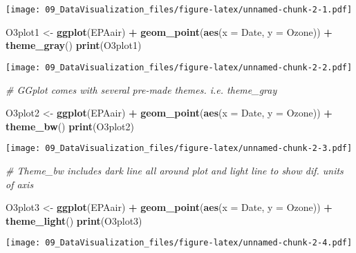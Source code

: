 \documentclass[]{article}
\newenvironment{Shaded}{\begin{snugshade}}{\end{snugshade}}
\newcommand{\KeywordTok}[1]{\textcolor[rgb]{0.13,0.29,0.53}{\textbf{#1}}}
\newcommand{\DataTypeTok}[1]{\textcolor[rgb]{0.13,0.29,0.53}{#1}}
\newcommand{\StringTok}[1]{\textcolor[rgb]{0.31,0.60,0.02}{#1}}
\newcommand{\CommentTok}[1]{\textcolor[rgb]{0.56,0.35,0.01}{\textit{#1}}}
\newcommand{\OperatorTok}[1]{\textcolor[rgb]{0.81,0.36,0.00}{\textbf{#1}}}
\newcommand{\NormalTok}[1]{#1}
\begin{document}
\texttt{[image: 09\_DataVisualization\_files/figure-latex/unnamed-chunk-2-1.pdf]}

\begin{Shaded}
\begin{Highlighting}[]
\NormalTok{O3plot1 <-}\StringTok{ }\KeywordTok{ggplot}\NormalTok{(EPAair) }\OperatorTok{+}
\StringTok{  }\KeywordTok{geom_point}\NormalTok{(}\KeywordTok{aes}\NormalTok{(}\DataTypeTok{x =}\NormalTok{ Date, }\DataTypeTok{y =}\NormalTok{ Ozone)) }\OperatorTok{+}
\StringTok{  }\KeywordTok{theme_gray}\NormalTok{()}
\KeywordTok{print}\NormalTok{(O3plot1)}
\end{Highlighting}
\end{Shaded}

\texttt{[image: 09\_DataVisualization\_files/figure-latex/unnamed-chunk-2-2.pdf]}

\begin{Shaded}
\begin{Highlighting}[]
\CommentTok{# GGplot comes with several pre-made themes. i.e. theme_gray}

\NormalTok{O3plot2 <-}\StringTok{ }\KeywordTok{ggplot}\NormalTok{(EPAair) }\OperatorTok{+}
\StringTok{  }\KeywordTok{geom_point}\NormalTok{(}\KeywordTok{aes}\NormalTok{(}\DataTypeTok{x =}\NormalTok{ Date, }\DataTypeTok{y =}\NormalTok{ Ozone)) }\OperatorTok{+}
\StringTok{  }\KeywordTok{theme_bw}\NormalTok{()}
\KeywordTok{print}\NormalTok{(O3plot2)}
\end{Highlighting}
\end{Shaded}

\texttt{[image: 09\_DataVisualization\_files/figure-latex/unnamed-chunk-2-3.pdf]}

\begin{Shaded}
\begin{Highlighting}[]
\CommentTok{# Theme_bw includes dark line all around plot and light line to show dif. units of axis}

\NormalTok{O3plot3 <-}\StringTok{ }\KeywordTok{ggplot}\NormalTok{(EPAair) }\OperatorTok{+}
\StringTok{  }\KeywordTok{geom_point}\NormalTok{(}\KeywordTok{aes}\NormalTok{(}\DataTypeTok{x =}\NormalTok{ Date, }\DataTypeTok{y =}\NormalTok{ Ozone)) }\OperatorTok{+}
\StringTok{  }\KeywordTok{theme_light}\NormalTok{()}
\KeywordTok{print}\NormalTok{(O3plot3)}
\end{Highlighting}
\end{Shaded}

\texttt{[image: 09\_DataVisualization\_files/figure-latex/unnamed-chunk-2-4.pdf]}
\end{document}
